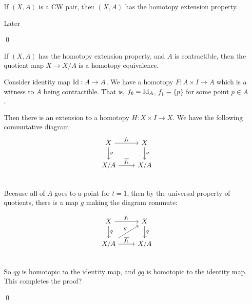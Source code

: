 \documentclass[x11names,reqno,14pt]{extarticle}
\begin{document}
\prop 

If $(X, A)$ is a CW pair, then $(X, A)$ has the homotopy extension property. 

\proof

Later

\qed

\thm 

If $(X, A)$ has the homotopy extension property, and $A$ is contractible, then the quotient map $X \to X/A$ is a homotopy equivalence. 

\proof

Consider identity map $\operatorname{\mathrm{Id}}:A\to A$. We have a homotopy $F:A\times I \to A$ which is a witness to $A$ being contractible. That is, $f_0 = \operatorname{\mathrm{Id}}_A$, $f_1 \equiv \{p\}$ for some point $p \in A$. 

Then there is an extension to a homotopy $H:X\times I \to X$. We have the following commutative diagram
\[
\begin{tikzcd}
X\ar[r, "f_t"] \ar[d, "q"] & X \ar[d, "q"] \\
X/A \ar[r, "\bar{f_t}"] & X/A \\
\end{tikzcd}
\]
Because all of $A$ goes to a point for $t = 1$, then by the universal property of quotients, there is a map $g$ making the diagram commute:

\[
\begin{tikzcd}
X\ar[r, "f_1"] \ar[d, "q"] & X \ar[d, "q"] \\
X/A \ar[ur, "g"]\ar[r, "\bar{f_1}"] & X/A \\
\end{tikzcd}
\]
So $qg$ is homotopic to the identity map, and $gq$ is homotopic to the identity map. This completes the proof? 

\qed
\end{document}
